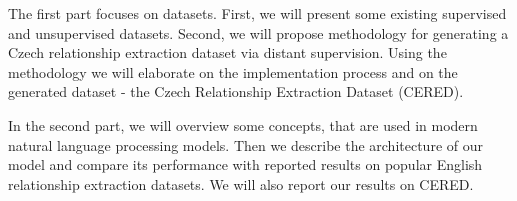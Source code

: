 The first part focuses on datasets. First, we will present some existing supervised and unsupervised datasets. Second, we will propose methodology for generating a Czech relationship extraction dataset via distant supervision. Using the methodology we will elaborate on the implementation process and on the generated dataset - the Czech Relationship Extraction Dataset (CERED).

In the second part, we will overview some concepts, that are used in modern natural language processing models. Then we describe the architecture of our model and compare its performance with reported results on popular English relationship extraction datasets. We will also report our results on CERED. 

